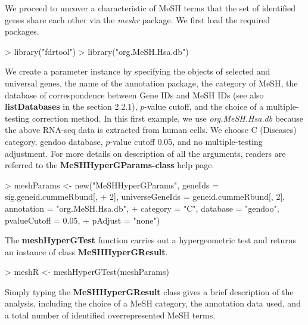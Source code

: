 \documentclass[11pt]{article}
\newcommand{\Rpackage}[1]{{\textit{#1}}}
\begin{document}
We proceed to uncover a characteristic of MeSH terms that the set of identified genes share each other via the \Rpackage{meshr} package. We first load the required packages.

\begin{center}
\begin{Schunk}
\begin{Sinput}
> library("fdrtool")
> library("org.MeSH.Hsa.db")
\end{Sinput}
\end{Schunk}
\end{center}

We create a parameter instance by specifying the objects of selected and universal genes, the name of the annotation package, the category of MeSH, the database of correspondence between Gene IDs and MeSH IDs (see also \textbf{listDatabases} in the section 2.2.1), $p$-value cutoff, and the choice of a multiple-testing correction method.
In this first example, we use \Rpackage{org.MeSH.Hsa.db} because the above RNA-seq data is extracted from human cells.
We choose C (Diseases) category, gendoo database, $p$-value cutoff 0.05, and no multiple-testing adjustment.
For more details on description of all the arguments, readers are referred to the \textbf{MeSHHyperGParams-class}
help page.

\begin{center}
\begin{Schunk}
\begin{Sinput}
> meshParams <- new("MeSHHyperGParams", geneIds = sig.geneid.cummeRbund[, 
+     2], universeGeneIds = geneid.cummeRbund[, 2], annotation = "org.MeSH.Hsa.db", 
+     category = "C", database = "gendoo", pvalueCutoff = 0.05, 
+     pAdjust = "none")
\end{Sinput}
\end{Schunk}
\end{center}

The \textbf{meshHyperGTest} function carries out a hypergeometric test and returns an instance of class \textbf{MeSHHyperGResult}.

\begin{center}
\begin{Schunk}
\begin{Sinput}
> meshR <- meshHyperGTest(meshParams)
\end{Sinput}
\end{Schunk}
\end{center}

Simply typing the \textbf{MeSHHyperGResult} class gives a brief description of the analysis, including
the choice of a MeSH category, the annotation data used, and a total number of identified overrepresented MeSH terms.
\end{document}
